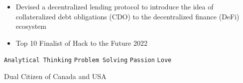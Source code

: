 \documentclass[9pt]{developercv} %
\begin{document}
\begin{entrylist}
		{
        \vspace{-10pt}
        \begin{itemize}[itemsep=3pt,topsep=0pt,parsep=0pt,partopsep=0pt, leftmargin=-1pt]
            \item Devised a decentralized lending protocol to introduce the idea of collateralized debt obligations (CDO) to the decentralized finance (DeFi) ecosystem
            \item Top 10 Finalist of Hack to the Future 2022
        \end{itemize} 
        \vspace{5pt}
        \texttt{Analytical Thinking} \slashsep \texttt{Problem Solving} \slashsep \texttt{Passion} \slashsep \texttt{Love}
        }
\end{entrylist}

\begin{center}
Dual Citizen of Canada and USA
\end{center}

\end{document}
